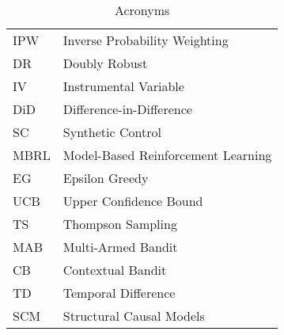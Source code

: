 \begin{table}[tbh]
\begin{tabular}{l|l}
        IPW  & Inverse Probability Weighting\\  
        DR  & Doubly Robust\\  
        IV  & Instrumental Variable\\  
         DiD  & Difference-in-Difference\\  
        SC  & Synthetic Control\\  
        MBRL & Model-Based Reinforcement Learning\\  
        EG  & Epsilon Greedy\\  
        UCB  & Upper Confidence Bound\\  
        TS  & Thompson Sampling\\  
        MAB  & Multi-Armed Bandit\\  
        CB  & Contextual Bandit\\  
        TD  & Temporal Difference\\  
        SCM  & Structural Causal Models\\  
    \hline
    \end{tabular}
    \caption{Acronyms}
    \label{tab:my_label}
\end{table}